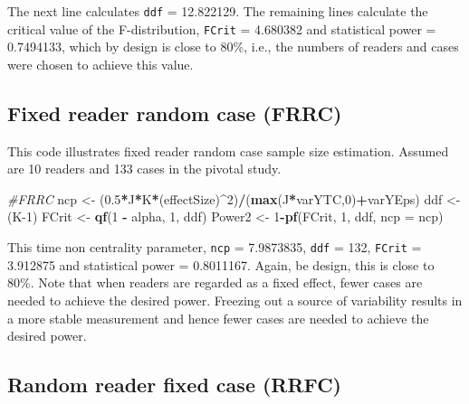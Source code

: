 \documentclass[]{book}
\newenvironment{Shaded}{\begin{snugshade}}{\end{snugshade}}
\newcommand{\CommentTok}[1]{\textcolor[rgb]{0.56,0.35,0.01}{\textit{#1}}}
\newcommand{\DataTypeTok}[1]{\textcolor[rgb]{0.13,0.29,0.53}{#1}}
\newcommand{\DecValTok}[1]{\textcolor[rgb]{0.00,0.00,0.81}{#1}}
\newcommand{\FloatTok}[1]{\textcolor[rgb]{0.00,0.00,0.81}{#1}}
\newcommand{\KeywordTok}[1]{\textcolor[rgb]{0.13,0.29,0.53}{\textbf{#1}}}
\newcommand{\NormalTok}[1]{#1}
\newcommand{\OperatorTok}[1]{\textcolor[rgb]{0.81,0.36,0.00}{\textbf{#1}}}
\newcommand{\StringTok}[1]{\textcolor[rgb]{0.31,0.60,0.02}{#1}}
\begin{document}
The next line calculates \texttt{ddf} = 12.822129. The remaining lines calculate the critical value of the F-distribution, \texttt{FCrit} = 4.680382 and statistical power = 0.7494133, which by design is close to 80\%, i.e., the numbers of readers and cases were chosen to achieve this value.

\hypertarget{fixed-reader-random-case-frrc}{%
\subsection{Fixed reader random case (FRRC)}\label{fixed-reader-random-case-frrc}}

This code illustrates fixed reader random case sample size estimation. Assumed are 10 readers and 133 cases in the pivotal study.

\begin{Shaded}
\begin{Highlighting}[]
\CommentTok{#FRRC}
\NormalTok{ncp <-}\StringTok{ }\NormalTok{(}\FloatTok{0.5}\OperatorTok{*}\NormalTok{J}\OperatorTok{*}\NormalTok{K}\OperatorTok{*}\NormalTok{(effectSize)}\OperatorTok{^}\DecValTok{2}\NormalTok{)}\OperatorTok{/}\NormalTok{(}\KeywordTok{max}\NormalTok{(J}\OperatorTok{*}\NormalTok{varYTC,}\DecValTok{0}\NormalTok{)}\OperatorTok{+}\NormalTok{varYEps)}
\NormalTok{ddf <-}\StringTok{ }\NormalTok{(K}\DecValTok{-1}\NormalTok{)}
\NormalTok{FCrit <-}\StringTok{ }\KeywordTok{qf}\NormalTok{(}\DecValTok{1} \OperatorTok{-}\StringTok{ }\NormalTok{alpha, }\DecValTok{1}\NormalTok{, ddf)}
\NormalTok{Power2 <-}\StringTok{ }\DecValTok{1}\OperatorTok{-}\KeywordTok{pf}\NormalTok{(FCrit, }\DecValTok{1}\NormalTok{, ddf, }\DataTypeTok{ncp =}\NormalTok{ ncp)}
\end{Highlighting}
\end{Shaded}

This time non centrality parameter, \texttt{ncp} = 7.9873835, \texttt{ddf} = 132, \texttt{FCrit} = 3.912875 and statistical power = 0.8011167. Again, be design, this is close to 80\%. Note that when readers are regarded as a fixed effect, fewer cases are needed to achieve the desired power. Freezing out a source of variability results in a more stable measurement and hence fewer cases are needed to achieve the desired power.

\hypertarget{random-reader-fixed-case-rrfc}{%
\subsection{Random reader fixed case (RRFC)}\label{random-reader-fixed-case-rrfc}}
\end{document}
